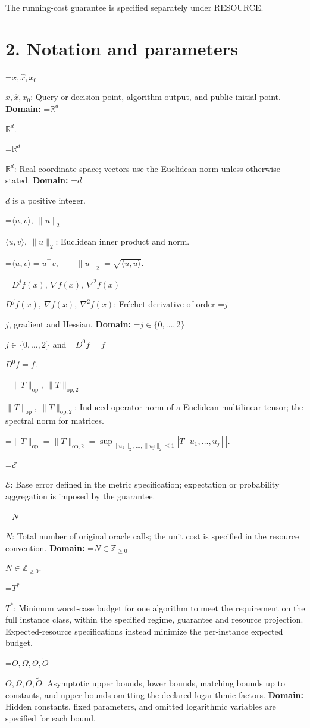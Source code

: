 \documentclass[10pt,a4paper]{article}
\newcommand{\AtlasMath}[1]{\par\begingroup\centering\setbox0=\hbox{$\displaystyle #1$}\ifdim\wd0>1.4\linewidth\typeout{ATLAS WIDE FORMULA: \the\wd0}\fi\ifdim\wd0>\linewidth\resizebox{\linewidth}{!}{\box0}\else\box0\fi\par\endgroup}
\newcommand{\AtlasInlineMath}[1]{\begingroup\setbox0=\hbox{$#1$}\ifdim\wd0>.4\linewidth\endgroup\AtlasMath{#1}\else\endgroup$#1$\fi}
\begin{document}
The running-cost guarantee is specified separately under RESOURCE.

\section{2. Notation and parameters}
\AtlasInlineMath{x,\widehat{x},x_0}: Query or decision point, algorithm output, and public initial point. \textbf{Domain:} \AtlasInlineMath{\mathbb{R}^d}.

\AtlasInlineMath{\mathbb{R}^d}: Real coordinate space; vectors use the Euclidean norm unless otherwise stated. \textbf{Domain:} \AtlasInlineMath{d} is a positive integer.

\AtlasInlineMath{\langle u,v\rangle,\ \|u\|_2}: Euclidean inner product and norm.


\AtlasMath{\langle u,v\rangle=u^\top v,\qquad\|u\|_2=\sqrt{\langle u,u\rangle}.}


\AtlasInlineMath{D^jf(x),\ \nabla f(x),\ \nabla^2f(x)}: Fréchet derivative of order \AtlasInlineMath{j}, gradient and Hessian. \textbf{Domain:} \AtlasInlineMath{j\in\{0,\ldots,2\}} and \AtlasInlineMath{D^0f=f}.

\AtlasInlineMath{\|T\|_{\mathrm{op}},\ \|T\|_{\mathrm{op},2}}: Induced operator norm of a Euclidean multilinear tensor; the spectral norm for matrices.


\AtlasMath{\|T\|_{\mathrm{op}}=\|T\|_{\mathrm{op},2}=\sup_{\|u_1\|_2,\ldots,\|u_j\|_2\le1}|T[u_1,\ldots,u_j]|.}


\AtlasInlineMath{\mathcal{E}}: Base error defined in the metric specification; expectation or probability aggregation is imposed by the guarantee.

\AtlasInlineMath{N}: Total number of original oracle calls; the unit cost is specified in the resource convention. \textbf{Domain:} \AtlasInlineMath{N\in\mathbb{Z}_{\ge0}}.

\AtlasInlineMath{T^*}: Minimum worst-case budget for one algorithm to meet the requirement on the full instance class, within the specified regime, guarantee and resource projection. Expected-resource specifications instead minimize the per-instance expected budget.

\AtlasInlineMath{O,\Omega,\Theta,\widetilde{O}}: Asymptotic upper bounds, lower bounds, matching bounds up to constants, and upper bounds omitting the declared logarithmic factors. \textbf{Domain:} Hidden constants, fixed parameters, and omitted logarithmic variables are specified for each bound.
\end{document}
